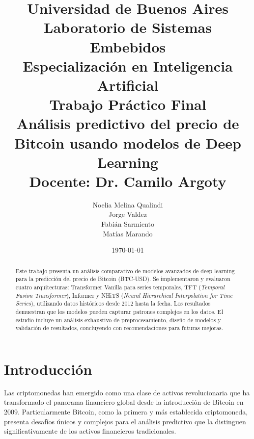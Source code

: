 \documentclass[12pt]{article}
\title{
    \vspace{-2cm}
    \normalsize \textbf{Universidad de Buenos Aires} \\
    \textbf{Laboratorio de Sistemas Embebidos} \\
    \textbf{Especialización en Inteligencia Artificial} \\
    \vspace{0.5cm}
    {Trabajo Práctico Final} \\
    \vspace{1cm}
    \Large \textbf{Análisis predictivo del precio de Bitcoin usando modelos de Deep Learning} \\
    \vspace{1cm}
    \large Docente: Dr. Camilo Argoty
    \vspace{1cm}
}
\author{
    Noelia Melina Qualindi \\
    Jorge Valdez \\
    Fabián Sarmiento \\
    Matías Marando
    \vspace{1cm}
}
\date{\today}
\begin{document}
\justifying  %
\maketitle


\begin{abstract}
Este trabajo presenta un análisis comparativo de modelos avanzados de deep learning para la predicción del precio de Bitcoin (BTC-USD). Se implementaron y evaluaron cuatro arquitecturas:  Transformer Vanilla para series temporales, TFT (\textit{Temporal Fusion Transformer}), Informer y  NHiTS (\textit{Neural Hierarchical Interpolation for Time Series}), utilizando datos históricos desde 2012 hasta la fecha.
Los resultados demuestran que los modelos pueden capturar patrones complejos en los datos. %
El estudio incluye un análisis exhaustivo de preprocesamiento, diseño de modelos y validación de resultados, concluyendo con recomendaciones para futuras mejoras.
\end{abstract}


\newpage
\section{Introducción}
\label{sec:intro}



Las criptomonedas han emergido como una clase de activos revolucionaria que ha transformado el panorama financiero global desde la introducción de Bitcoin en 2009. Particularmente Bitcoin, como la primera y más establecida criptomoneda, presenta desafíos únicos y complejos para el análisis predictivo que la distinguen significativamente de los activos financieros tradicionales.
\end{document}
